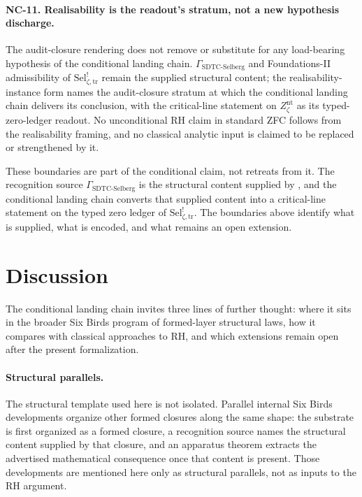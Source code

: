\documentclass[11pt]{article}
\newcommand{\Znt}{Z_{\zeta}^{\mathrm{nt}}}
\newcommand{\Sel}{\mathrm{Sel}^{!}_{\zeta,\mathrm{tr}}}
\newcommand{\GamSDTCSelberg}{\Gamma_{\mathrm{SDTC\text{-}Selberg}}}
\theoremstyle{definition}
\begin{document}
\paragraph{NC-11. Realisability is the readout's stratum, not a
new hypothesis discharge.}
The audit-closure rendering does not remove or substitute for any
load-bearing hypothesis of the conditional landing chain.
\(\GamSDTCSelberg\) and Foundations-II admissibility of \(\Sel\)
remain the supplied structural content; the realisability-instance
form names the audit-closure stratum at which the conditional
landing chain delivers its conclusion, with the critical-line
statement on \(\Znt\) as its typed-zero-ledger readout.  No
unconditional RH claim in standard ZFC follows from the
realisability framing, and no classical analytic input is claimed to
be replaced or strengthened by it.

These boundaries are part of the conditional claim, not retreats
from it.  The recognition source \(\GamSDTCSelberg\) is the
structural content supplied by \citet{TsiokosSDTC2026}, and the
conditional landing chain converts that supplied content into a
critical-line statement on the typed zero ledger of \(\Sel\).  The
boundaries above identify what is supplied, what is encoded, and
what remains an open extension.
 

\section{Discussion}
\label{sec:discussion}

The conditional landing chain invites three lines of further
thought: where it sits in the broader Six Birds program of
formed-layer structural laws, how it compares with classical
approaches to RH, and which extensions remain open after the present
formalization.

\paragraph{Structural parallels.}
The structural template used here is not isolated.  Parallel
internal Six Birds developments organize other formed closures
along the same shape: the substrate is first organized as a formed
closure, a recognition source names the structural content supplied
by that closure, and an apparatus theorem extracts the advertised
mathematical consequence once that content is present.  Those
developments are mentioned here only as structural parallels, not
as inputs to the RH argument.
\end{document}
